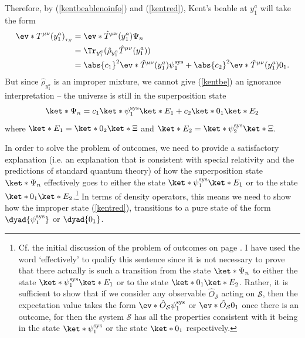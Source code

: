 \documentclass[12pt]{report}
\begin{document}
Therefore, by (\ref{kentbeablenoinfo}) and (\ref{kentred}), Kent's beable at $y^a_1$ will take the form 
\begin{equation}\label{kentbe}
\begin{split}
\ev*{T^{\mu\nu}(y^a_1)}_{\tau_S}&= \ev*{\hat{T}^{\mu\nu}(y^a_1)}{\Psi_n} \\
&=\Tr_{y^a_1}(\hat{\rho}_{y^a_1}\hat{T}^{\mu\nu}(y^a_1))\\
&=\abs{c_1}^2\ev*{\hat{T}^{\mu\nu}(y^a_1)}{\psi_1^\text{sys}}+\abs{c_2}^2\ev*{\hat{T}^{\mu\nu}(y^a_1)}{0_1}.
\end{split}
\end{equation}
But since $\hat{\rho}_{y^a_1}$ is an improper mixture, we cannot give (\ref{kentbe}) an ignorance interpretation -- the universe is still in the superposition state
$$\ket*{\Psi_n}=c_1 \ket*{\psi_1^\text{sys}}\ket*{E_1}+c_2 \ket*{0_1}\ket*{E_2}$$ where $\ket*{E_1}=\ket*{0_2}\ket*{\Xi}$ and $\ket*{E_2}=\ket*{\psi_2^\text{sys}}\ket*{\Xi}$. 

In order to solve the problem of outcomes, we need to provide a satisfactory explanation (i.e. an explanation that is consistent with special relativity and the predictions of standard quantum theory)  of how the superposition state $\ket*{\Psi_n}$ effectively goes to either the state $\ket*{\psi_1^\text{sys}}\ket*{E_1}$ or to the state $\ket*{0_1}\ket*{E_2}$.\footnote{Cf. the initial discussion of the problem of outcomes on page \pageref{proboutcomes}. I have used the word `effectively' to qualify this sentence since it is not necessary to prove that there actually is such a transition from the state  $\ket*{\Psi_n}$ to either the state $\ket*{\psi_1^\text{sys}}\ket*{E_1}$ or to the state $\ket*{0_1}\ket*{E_2}$. Rather, it is sufficient to show that if we consider any observable $\hat{O}_{\mathcal{S}}$ acting on $\mathcal{S}$, then the expectation value takes the form $\ev*{\hat{O}_{\mathcal{S}}}{\psi_1^\text{sys}}$ or $\ev*{\hat{O}_{\mathcal{S}}}{0_1}$ once there is an outcome, for then the system $\mathcal{S}$ has all the properties consistent with it being in the state $\ket*{\psi_1^\text{sys}}$ or the state $\ket*{0_1}$ respectively.} In terms of density operators, this means we need to show how the improper state (\ref{kentred}), transitions to a pure state of the form $\dyad{\psi_1^\text{sys}}$ or $\dyad{0_1}$.  
\end{document}
